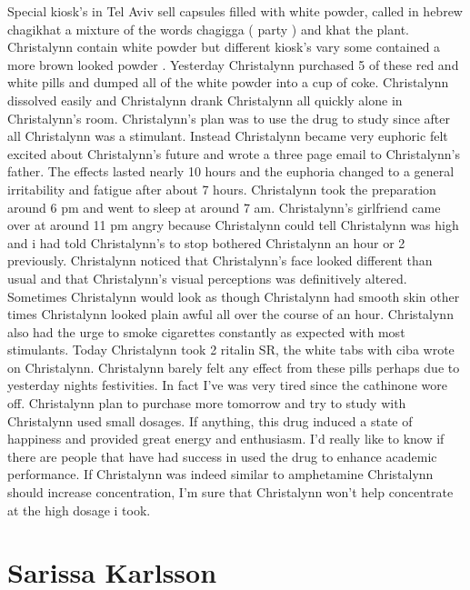 \documentclass[12pt]{book}
\begin{document}
Special kiosk's in Tel Aviv sell capsules filled with white powder, called in hebrew chagikhat a mixture of the words chagigga ( party ) and khat the plant. Christalynn contain white powder but different kiosk's vary some contained a more brown looked powder . Yesterday Christalynn purchased 5 of these red and white pills and dumped all of the white powder into a cup of coke. Christalynn dissolved easily and Christalynn drank Christalynn all quickly alone in Christalynn's room. Christalynn's plan was to use the drug to study since after all Christalynn was a stimulant. Instead Christalynn became very euphoric felt excited about Christalynn's future and wrote a three page email to Christalynn's father. The effects lasted nearly 10 hours and the euphoria changed to a general irritability and fatigue after about 7 hours. Christalynn took the preparation around 6 pm and went to sleep at around 7 am. Christalynn's girlfriend came over at around 11 pm angry because Christalynn could tell Christalynn was high and i had told Christalynn's to stop bothered Christalynn an hour or 2 previously. Christalynn noticed that Christalynn's face looked different than usual and that Christalynn's visual perceptions was definitively altered. Sometimes Christalynn would look as though Christalynn had smooth skin other times Christalynn looked plain awful all over the course of an hour. Christalynn also had the urge to smoke cigarettes constantly as expected with most stimulants. Today Christalynn took 2 ritalin SR, the white tabs with ciba wrote on Christalynn. Christalynn barely felt any effect from these pills perhaps due to yesterday nights festivities. In fact I've was very tired since the cathinone wore off. Christalynn plan to purchase more tomorrow and try to study with Christalynn used small dosages. If anything, this drug induced a state of happiness and provided great energy and enthusiasm. I'd really like to know if there are people that have had success in used the drug to enhance academic performance. If Christalynn was indeed similar to amphetamine Christalynn should increase concentration, I'm sure that Christalynn won't help concentrate at the high dosage i took.



\chapter{Sarissa Karlsson}
\end{document}
